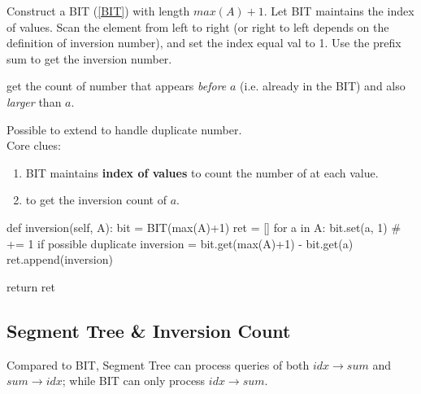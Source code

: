 Construct a BIT (\ref{BIT}) with length $max(A)+1$. Let BIT maintains the index of values. Scan the element from left to right (or right to left depends on the definition of inversion number), and set the index equal val to 1. Use the prefix sum to get the inversion number.

 get the count of number that appears \textit{before} $a$ (i.e. already in the BIT) and also \textit{larger} than $a$. 

Possible to extend to handle duplicate number. 
\\
Core clues:
\begin{enumerate}
\item BIT maintains \textbf{index of values} to count the number of at each value.
\item {} to get the inversion count of $a$.
\end{enumerate}
\begin{python}
def inversion(self, A):
    bit = BIT(max(A)+1)
    ret = []
    for a in A:
        bit.set(a, 1)  # += 1 if possible duplicate 
        inversion = bit.get(max(A)+1) - bit.get(a)
        ret.append(inversion)

    return ret
\end{python}

\subsection{Segment Tree \& Inversion Count}\label{segmentTreeInversionCount}
Compared to BIT, Segment Tree can process queries of both $idx \rightarrow sum$ and $sum \rightarrow idx$; while BIT can only process $idx \rightarrow sum$.

